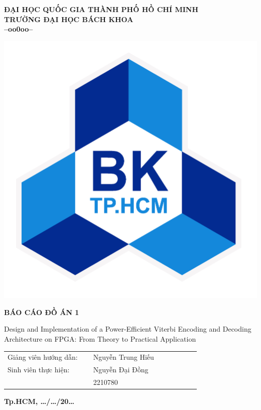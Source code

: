 \BgThispage
\begin{center}
	\Large\textbf{ĐẠI HỌC QUỐC GIA THÀNH PHỐ HỒ CHÍ MINH \\ TRƯỜNG ĐẠI HỌC BÁCH KHOA\\--oo0oo--}
\end{center}
\vspace{0.5cm}
\begin{center}
	\includegraphics[width=0.3\linewidth]{sections/pic/01_logobachkhoatoi.png}
\end{center}
\vspace{0.4cm}
\begin{center}
	\LARGE\textbf{BÁO CÁO ĐỒ ÁN 1}
	\vspace{0.1cm}
	
	\Large{Design and Implementation of a Power-Efficient Viterbi
		Encoding and Decoding Architecture on FPGA: From
		Theory to Practical Application}
\end{center}
\vspace{1cm}

\LARGE

\hspace{2cm}\begin{tabular}{p{0.4\linewidth} p{0.5\linewidth}}
	Giảng viên hướng dẫn: & Nguyễn Trung Hiếu\\
	Sinh viên thực hiện:  & Nguyễn Đại Đồng \\
	                      & 2210780
\end{tabular}

\vspace{6cm}
\begin{center}
	\fontsize{8pt}{5pt}\selectfont\textbf{Tp.HCM, \dots/\dots/20\dots}
\end{center}

\newpage
\fontsize{13}{14}\selectfont
\tableofcontents
\listoffigures
\listoftables